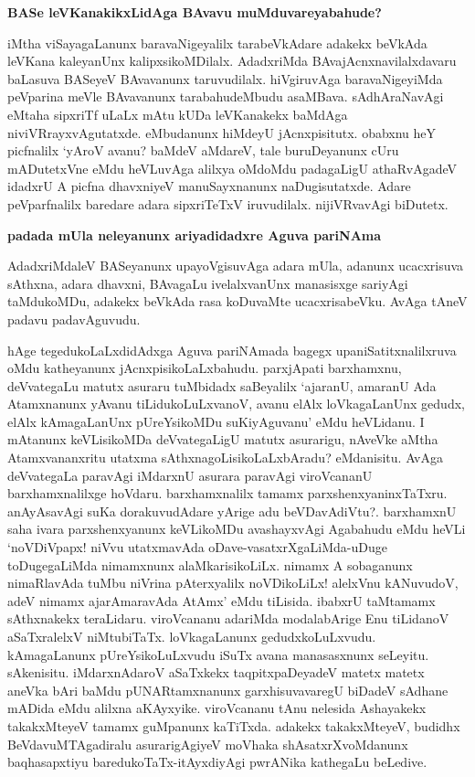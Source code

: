 {\bigskip
\noindent
{\large\bf BASe leVKanakikxLidAga BAvavu muMduvareyabahude?}}\label{page186}
\medskip

\noindent
iMtha viSayagaLanunx baravaNigeyalilx tarabeVkAdare adakekx beVkAda leVKana kaleyanUnx kalipxsikoM\-Dilalx. AdadxriMda BAvajAcnxnavilalxdavaru baLasuva BASeyeV BAvavanunx taruvudilalx. hiVgiruvAga bara\-vaNigeyiMda peVparina meVle BAvavanunx tarabahudeMbudu asaMBava. sAdhAraNavAgi eMtaha sipxriTf uLaLx mAtu\- kUDa leVKanakekx baMdAga niviVRrayxvAgutatxde. eMbudanunx hiMdeyU jAcnxpisitutx. obabxnu heY picfnalilx `yAroV avanu? baMdeV aMdareV, tale buruDeyanunx cUru mADutetxVne eMdu heVLuvAga alilxya oMdoMdu padagaLigU athaRvAgadeV idadxrU A picfna dhavxniyeV manuSayxnanunx naDugisutatxde. Adare peVparfnalilx baredare adara sipxriTeTxV iruvudilalx. nijiVRvavAgi biDutetx.

{\bigskip
\noindent
{\large\bf padada mUla neleyanunx ariyadidadxre Aguva pariNAma}}
\medskip

\noindent
AdadxriMdaleV BASeyanunx upayoVgisuvAga adara mUla, adanunx ucacxrisuva sAthxna, adara dhavxni, BAvagaLu ivelalxvanUnx manasisxge sariyAgi taMdukoMDu, adakekx beVkAda rasa koDuvaMte ucacxrisa\-beVku. AvAga tAneV padavu padavAguvudu.

hAge tegedukoLaLxdidAdxga Aguva pariNAmada bagegx upaniSatitxnalilxruva oMdu katheyanunx jAcnxpisi\-koLaLxbahudu. parxjApati barxhamxnu, deVvategaLu matutx asuraru tuMbidadx saBeyalilx `ajaranU, ama\-ranU Ada Atamxnanunx yAvanu tiLidukoLuLxvanoV, avanu elAlx loVkagaLanUnx gedudx, elAlx kAma\-gaLanUnx pUreYsikoMDu suKiyAguvanu' eMdu heVLidanu. I mAtanunx keVLisikoMDa deVvate\-gaLigU matutx asurarigu, nAveVke aMtha Atamxvananxritu utatxma sAthxnagoLisikoLaLxbAradu? eMdanisitu. AvAga\- deVvate\-gaLa paravAgi iMdarxnU asurara paravAgi viroVcananU barxhamxnalilxge hoVdaru. barxhamxnalilx tamamx parxshenxyaninxTaTxru. anAyAsavAgi suKa dorakuvudAdare yArige adu beVDavAdiVtu?. barxhamxnU saha ivara parxshenxyanunx keVLikoMDu avashayxvAgi Agabahudu eMdu heVLi `noVDiVpapx! niVvu utatxma\-vAda oDave-vasatxrXgaLiMda-uDuge toDugegaLiMda nimamxnunx alaMkarisikoLiLx. nimamx A sobaganunx nimaR\-lavAda tuMbu niVrina pAterxyalilx noVDikoLiLx! alelxVnu kANuvudoV, adeV nimamx ajarAmaravAda AtAmx' eMdu tiLisida. ibabxrU taMtamamx sAthxnakekx teraLidaru. viroVcananu adariMda modalabArige Enu tiLidanoV aSaTxralelxV niMtubiTaTx. loVkagaLanunx gedudxkoLuLxvudu. kAmagaLanunx pUreYsikoLuLxvudu iSuTx avana manasasxnunx seLeyitu. sAkenisitu. iMdarxnAdaroV aSaTxkekx taqpitxpaDeyadeV matetx matetx aneVka bAri baMdu pUNARtamxnanunx garxhisuvavaregU biDadeV sAdhane mADida eMdu alilxna aKAyxyike. viroV\-cananu tAnu nelesida Ashayakekx takakxMteyeV tamamx guMpanunx kaTiTxda. adakekx takakxMteyeV, budidhx BeVda\-vuMTAgadiralu asurarigAgiyeV moVhaka shAsatxrXvoMdanunx baqhasapxtiyu baredukoTaTx-itAyxdiyAgi pwrANika kathegaLu beLedive.

